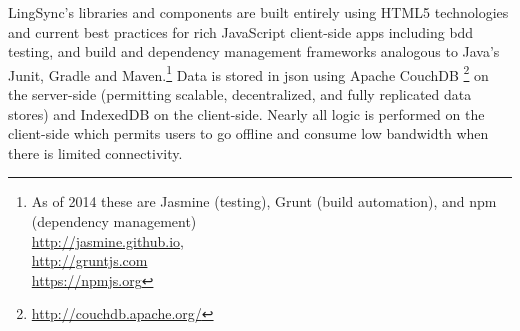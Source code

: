 \documentclass[11pt]{article}
\newcommand{\smalltodo}[2][]
    {\todo[caption={#2}, #1]
    {\tiny#2\normalsize}}
\begin{document}
LingSync's libraries and components are built entirely using HTML5 technologies
and current best practices for rich JavaScript client-side apps including
\gls{bdd} testing, and build and dependency management frameworks analogous to
Java's Junit, Gradle and Maven.\footnote{As of 2014 these are Jasmine (testing), Grunt (build automation), and \gls{npm} (dependency management)\\
\url{http://jasmine.github.io}, \\
\url{http://gruntjs.com} \\
\url{https://npmjs.org}}
Data is stored in \gls{json} using Apache CouchDB%
\footnote{\url{http://couchdb.apache.org/}} %
on the server-side (permitting scalable, decentralized, and fully replicated data
stores) and IndexedDB on the client-side. Nearly all logic is performed on the
client-side which permits  users to go offline and consume low bandwidth
when there is limited connectivity.

\end{document}
